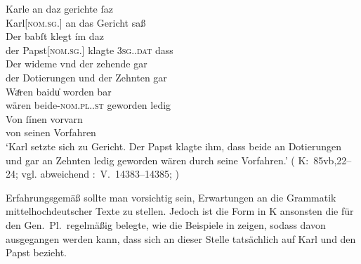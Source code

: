 \begin{exe}
\ex\label{ex:babstimbaideu}
	\gll Karle an daz gerichte ſaz \\
		Karl[\textsc{nom.sg.\MascM}] an das Gericht saß \\
\sn \gll Der babſt klegt ím daz \\
		der Papst[\textsc{nom.sg.\MascM}] klagte \textsc{3sg.\MascM.dat} dass \\
\sn \gll Der wideme vnd der zehende gar \\
		der Dotierungen und der Zehnten gar \\
\sn \gll Waͤren baidu̍ worden bar \\
		wären beide-\textsc{nom.pl.\NeutM.st} geworden ledig \\
\sn \gll Von ſínen vorvarn \\
		von seinen Vorfahren \\
	\trans `Karl setzte sich zu Gericht. Der Papst klagte ihm, dass
		 beide an Dotierungen und gar an Zehnten ledig geworden
		wären durch seine Vorfahren.'
		(%
			K:~85vb,22--24; vgl. abweichend
			\KC:~V.~14383--14385;
			\cite[341]{schroeder1895}%
		)
\end{exe}

Erfahrungsgemäß sollte man vorsichtig sein, Erwartungen an die Grammatik
mittelhochdeutscher Texte zu stellen. Jedoch ist die Form
 in K ansonsten die für den Gen.\ Pl.\ regelmäßig belegte, wie die
Beispiele in  zeigen, sodass davon ausgegangen werden kann,
dass sich  an dieser Stelle tatsächlich auf Karl und den Papst
bezieht.

